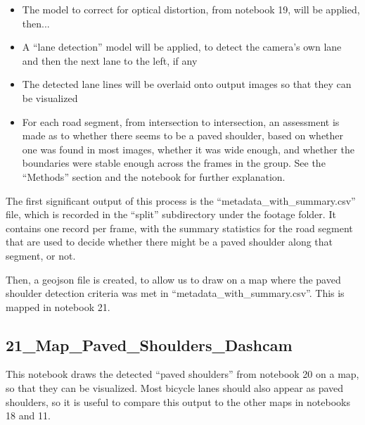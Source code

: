 \documentclass[11pt,twoside]{report}
\begin{document}
\begin{itemize}
\item{The model to correct for optical distortion, from notebook 19, will be applied, then...}
\item{A ``lane detection'' model will be applied, to detect the camera's own lane and then the next lane to the left, if any}
\item{The detected lane lines will be overlaid onto output images so that they can be visualized}
\item{For each road segment, from intersection to intersection, an assessment is made as to whether there seems to be a paved shoulder, based on whether one was found in most images, whether it was wide enough, and whether the boundaries were stable enough across the frames in the group.  See the ``Methods'' section and the notebook for further explanation.}	
\end{itemize}

The first significant output of this process is the ``metadata\_with\_summary.csv'' file, which is recorded in the ``split'' subdirectory under the footage folder.  It contains one record per frame, with the summary statistics for the road segment that are used to decide whether there might be a paved shoulder along that segment, or not.

Then, a geojson file is created, to allow us to draw on a map where the paved shoulder detection criteria was met in ``metadata\_with\_summary.csv''.  This is mapped in notebook 21.


\subsection{21\_Map\_Paved\_Shoulders\_Dashcam}
\label{a21}

This notebook draws the detected ``paved shoulders'' from notebook 20 on a map, so that they can be visualized.  Most bicycle lanes should also appear as paved shoulders, so it is useful to compare this output to the other maps in notebooks 18 and 11.


\cleardoublepage


\end{document}
